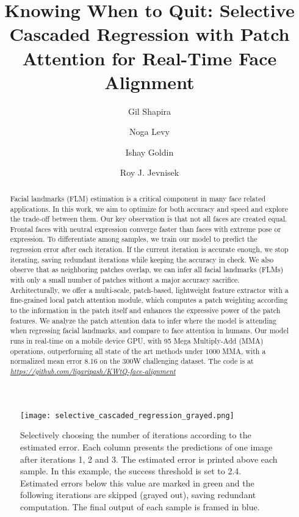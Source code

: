 \documentclass[twocolumn]{article}
\title{Knowing When to Quit: Selective Cascaded Regression with Patch Attention for Real-Time Face Alignment}
\author[1,2]{Gil Shapira}
\author[1]{Noga Levy}
\author[1]{Ishay Goldin}
\author[1]{Roy J. Jevnisek}
\affil[1]{Samsung Semiconductor Israel R\&D Center (SIRC)}
\affil[2]{Faculty of Engineering, Bar-Ilan University}
\affil[ ]{\textit {ggiillsshhaappiirraa@gmail.com}}
\affil[ ]{\textit {nogaor@gmail.com}}
\affil[ ]{\textit {\{ishay.goldin,roy.jevnisek\}@samsung.com}}
\date{}
\begin{document}
\maketitle







\begin{abstract}
Facial landmarks (FLM) estimation is a critical component in many face related applications.
In this work, we aim to optimize for both accuracy and speed and explore the trade-off between them. 
Our key observation is that not all faces are created equal. Frontal faces with neutral expression converge faster than faces with extreme pose or expression. To differentiate among samples, we train our model to predict the regression error after each iteration. 
If the current iteration is accurate enough, we stop iterating, saving redundant iterations while keeping the accuracy in check. We also observe that as neighboring patches overlap, we can infer all facial landmarks (FLMs) with only a small number of patches without a major accuracy sacrifice.
Architecturally, we offer a multi-scale, patch-based, lightweight feature extractor with a fine-grained local patch attention module, which computes a patch weighting according to the information in the patch itself and enhances the expressive power of the patch features. We analyze the patch attention data to infer where the model is attending when regressing facial landmarks, and compare to face attention in humans.
Our model runs in real-time on a mobile device GPU, with 95 Mega Multiply-Add (MMA) operations, outperforming all state of the art methods under 1000 MMA, with a normalized mean error 8.16 on the 300W challenging dataset. The code is at \emph{\url{https://github.com/ligaripash/KWtQ-face-alignment}}
\end{abstract}


\begin{figure}[H]
\texttt{[image: selective\_cascaded\_regression\_grayed.png]}
\caption{Selectively choosing the number of iterations according to the estimated error. Each column presents the predictions of one image after iterations 1, 2 and 3. The estimated error is printed above each sample. In this example, the success threshold is set to 2.4. Estimated errors below this value are marked in green and the following iterations are skipped (grayed out), saving redundant computation. The final output of each sample is framed in blue.}
\label{fig:selective_iterations}
\end{figure}
\end{document}
